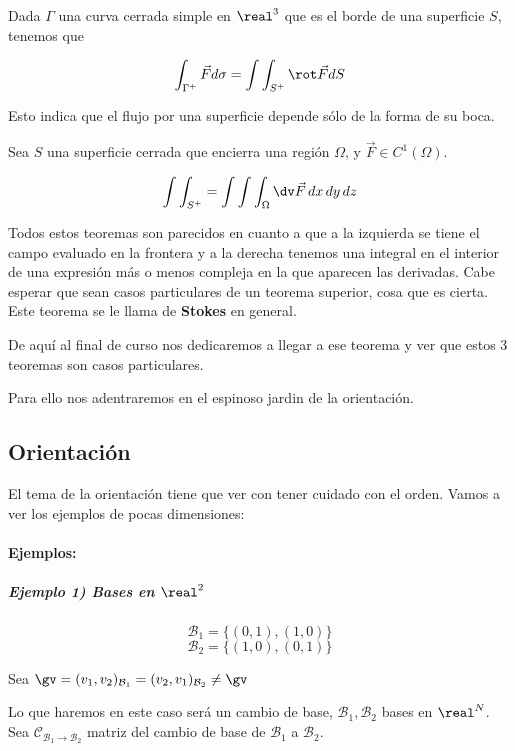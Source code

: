 \begin{theorem}
Dada $\Gamma$ una curva cerrada simple en $\real^3$ que es el borde de una superficie $S$, tenemos que 

\[ \int_{\Gamma^+}\vec{F}d\sigma =\int\int_{S^+}\rot \vec{F}dS \]

Esto indica que el flujo por una superficie depende sólo de la forma de su boca.
\end{theorem}

\begin{theorem}
Sea $S$ una superficie cerrada que encierra una región $\Omega$, y $\vec{F}\in C^1(\Omega)$.

\[ \int\int_{S^+} = \int\int\int_\Omega \dv \vec{F}\, dx\, dy\, dz \]
\end{theorem}


Todos estos teoremas son parecidos en cuanto a que a la izquierda se tiene el campo evaluado en la frontera y a la derecha tenemos una integral en el interior de una expresión más o menos compleja en la que aparecen las derivadas. Cabe esperar que sean casos particulares de un teorema superior, cosa que es cierta. Este teorema se le llama de \textbf{Stokes} en general. 

De aquí al final de curso nos dedicaremos a llegar a ese teorema y ver que estos 3 teoremas son casos particulares. 

Para ello nos adentraremos en el espinoso jardin de la orientación.

\subsection{Orientación} 
El tema de la orientación tiene que ver con tener cuidado con el orden. Vamos a ver los ejemplos de pocas dimensiones:

\paragraph{Ejemplos:}

\subparagraph{Ejemplo 1) Bases en $\real^2$}

\[\mathcal{B}_1 = \{(0,1),(1,0)\}\]
\[\mathcal{B}_2 = \{(1,0),(0,1)\}\]

Sea $\gv = (v_1,v_2)_{\mathcal{B}_1} = (v_2,v_1)_{\mathcal{B}_2} \neq \gv$

Lo que haremos en este caso será un cambio de base, $\mathcal{B}_1,\mathcal{B}_2$ bases en $\real^N$. Sea $\mathcal{C}_{\mathcal{B}_1\to\mathcal{B}_2}$ matriz del cambio de base de $\mathcal{B}_1$ a $\mathcal{B}_2$.

